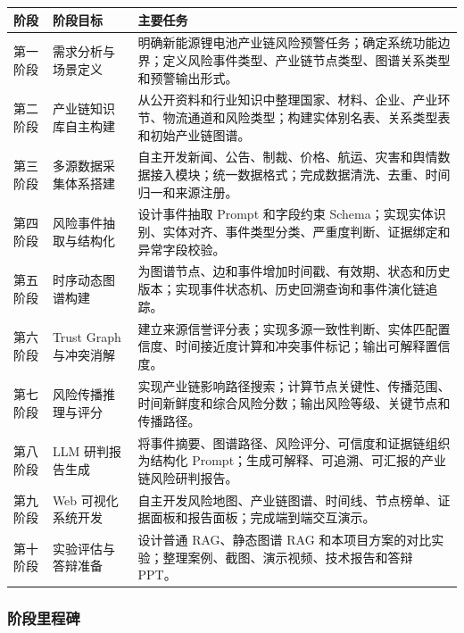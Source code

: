 \documentclass[12pt,a4paper]{article}
\begin{document}
\begin{center}
\begin{longtable}{p{2.2cm} p{3.2cm} p{7.2cm}}
\toprule
阶段 & 阶段目标 & 主要任务 \\
\midrule
第一阶段 & 需求分析与场景定义 & 明确新能源锂电池产业链风险预警任务；确定系统功能边界；定义风险事件类型、产业链节点类型、图谱关系类型和预警输出形式。 \\
第二阶段 & 产业链知识库自主构建 & 从公开资料和行业知识中整理国家、材料、企业、产业环节、物流通道和风险类型；构建实体别名表、关系类型表和初始产业链图谱。 \\
第三阶段 & 多源数据采集体系搭建 & 自主开发新闻、公告、制裁、价格、航运、灾害和舆情数据接入模块；统一数据格式；完成数据清洗、去重、时间归一和来源注册。 \\
第四阶段 & 风险事件抽取与结构化 & 设计事件抽取 Prompt 和字段约束 Schema；实现实体识别、实体对齐、事件类型分类、严重度判断、证据绑定和异常字段校验。 \\
第五阶段 & 时序动态图谱构建 & 为图谱节点、边和事件增加时间戳、有效期、状态和历史版本；实现事件状态机、历史回溯查询和事件演化链追踪。 \\
第六阶段 & Trust Graph 与冲突消解 & 建立来源信誉评分表；实现多源一致性判断、实体匹配置信度、时间接近度计算和冲突事件标记；输出可解释置信度。 \\
第七阶段 & 风险传播推理与评分 & 实现产业链影响路径搜索；计算节点关键性、传播范围、时间新鲜度和综合风险分数；输出风险等级、关键节点和传播路径。 \\
第八阶段 & LLM 研判报告生成 & 将事件摘要、图谱路径、风险评分、可信度和证据链组织为结构化 Prompt；生成可解释、可追溯、可汇报的产业链风险研判报告。 \\
第九阶段 & Web 可视化系统开发 & 自主开发风险地图、产业链图谱、时间线、节点榜单、证据面板和报告面板；完成端到端交互演示。 \\
第十阶段 & 实验评估与答辩准备 & 设计普通 RAG、静态图谱 RAG 和本项目方案的对比实验；整理案例、截图、演示视频、技术报告和答辩 PPT。 \\
\bottomrule
\end{longtable}
\end{center}

\subsubsection{阶段里程碑}
\end{document}
